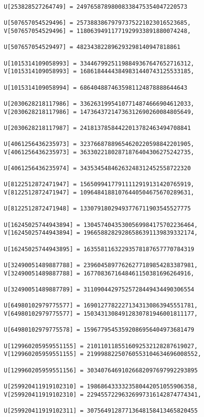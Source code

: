 \documentclass[a4paper]{article}
\begin{document}
\begin{verbatim}
U[253828527264749] = 24976587898008338475354047220573

U[507657054529496] = 25738838679797375221023016523685, 
V[507657054529496] = 11806394911771929933891880074248, 

U[507657054529497] = 482343822896293298140947818861

U[1015314109058993] = 33446799251198849367647652716312, 
V[1015314109058993] = 16861844443849831440743125533185, 

U[1015314109058994] = 6864048874635981124878888644643

U[2030628218117986] = 33626319954107714874666904612033, 
V[2030628218117986] = 14736437214736312690260084805649, 

U[2030628218117987] = 24181378584422013782463494708841

U[4061256436235973] = 32376687889654620220598842201905, 
V[4061256436235973] = 36330221802871876404306275242735, 

U[4061256436235974] = 34353454846263248312452558722320

U[8122512872471947] = 15650994177911112919131420765919, 
V[8122512872471947] = 10964841881076440504675670289631, 

U[8122512872471948] = 13307918029493776711903545527775

U[16245025744943894] = 13045740435300569984175702236464, 
V[16245025744943894] = 19665882829286586391139839332174, 

U[16245025744943895] = 16355811632293578187657770784319

U[32490051489887788] = 23960458977626277189854283387981, 
V[32490051489887788] = 1677083671648461150381696264916, 

U[32490051489887789] = 31109044297525728449434490306554

U[64980102979775577] = 16901277822271343130863945551781, 
V[64980102979775577] = 15034313084912830781946001811177, 

U[64980102979775578] = 15967795453592086956404973681479

U[129960205959551155] = 2101101185516092532128287619027, 
V[129960205959551155] = 21999882250760553104634696008552, 

U[129960205959551156] = 30340764691026682097697992293895

U[259920411919102310] = 1986864333323580442051055906358, 
V[259920411919102310] = 22945572296326997316142874774341, 

U[259920411919102311] = 30756491287713648158413465820455


\end{verbatim}
\end{document}
